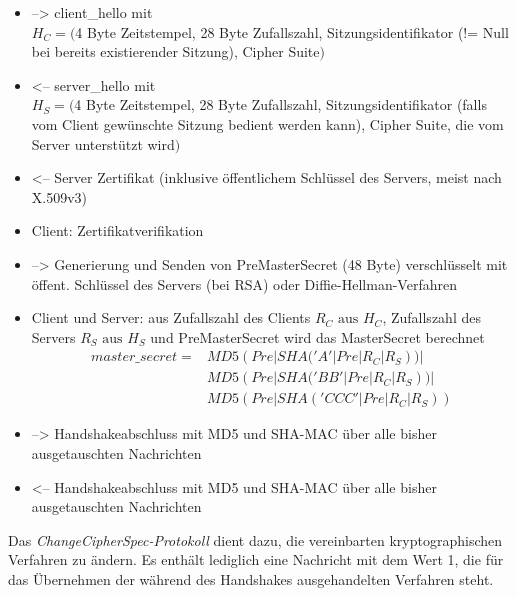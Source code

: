\documentclass[
    12pt,
    headings=small,
    parskip=half,           %
    bibliography=totoc,
    numbers=noenddot,       %
    open=any,               %
    ]{scrreprt}
\begin{document}

\begin{itemize}
\item --> client\_hello mit \\
\(H_C = (\)4 Byte Zeitstempel, 28 Byte Zufallszahl, Sitzungsidentifikator (!= Null bei bereits existierender Sitzung), Cipher Suite\()\)

\item <-- server\_hello mit \\
\(H_S = (\)4 Byte Zeitstempel, 28 Byte Zufallszahl, Sitzungsidentifikator (falls vom Client gewünschte Sitzung bedient werden kann), Cipher Suite, die vom Server unterstützt wird\()\)

\item <-- Server Zertifikat (inklusive öffentlichem Schlüssel des Servers, meist nach X.509v3)

\item Client: Zertifikatverifikation

\item --> Generierung und Senden von PreMasterSecret (48 Byte) verschlüsselt mit öffent. Schlüssel des Servers (bei RSA) oder Diffie-Hellman-Verfahren

\item Client und Server: aus Zufallszahl des Clients \(R_C \text{ aus } H_C\), Zufallszahl des Servers \(R_S \text{ aus } H_S\) und PreMasterSecret wird das MasterSecret berechnet
\begin{align*}
master\_secret = &MD5(Pre | SHA('A' | Pre | R_C | R_S)) |\\
	&MD5(Pre | SHA('BB' | Pre | R_C | R_S)) |\\
 	&MD5(Pre | SHA('CCC' | Pre | R_C | R_S))
\end{align*}

\item --> Handshakeabschluss mit MD5 und SHA-MAC über alle bisher ausgetauschten Nachrichten

\item <-- Handshakeabschluss mit MD5 und SHA-MAC über alle bisher ausgetauschten Nachrichten
\end{itemize}


Das \emph{ChangeCipherSpec-Protokoll} dient dazu, die vereinbarten kryptographischen Verfahren zu ändern. Es enthält lediglich eine Nachricht mit dem Wert 1, die für das Übernehmen der während des Handshakes ausgehandelten Verfahren steht. \cite{eckert13}
\end{document}
